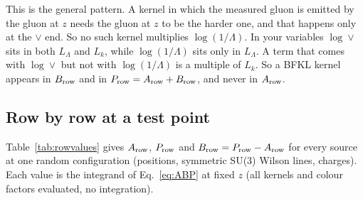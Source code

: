 \documentclass[10pt]{article}
\numberwithin{equation}{section}
\newcommand{\LL}{L_\Lambda}
\newcommand{\Lk}{L_k}
\begin{document}
This is the general pattern. A kernel in which the measured gluon is emitted by the gluon at $z$ needs the gluon at $z$ to be the harder one, and that happens only at the $\vee$ end. So no such kernel multiplies $\log(1/\Lambda)$. In your variables $\log\vee$ sits in both $\LL$ and $\Lk$, while $\log(1/\Lambda)$ sits only in $\LL$. A term that comes with $\log\vee$ but not with $\log(1/\Lambda)$ is a multiple of $\Lk$. So a BFKL kernel appears in $B_{\rm row}$ and in $P_{\rm row}=A_{\rm row}+B_{\rm row}$, and never in $A_{\rm row}$.

\subsection{Row by row at a test point}\label{sec:rowvalues}
Table~\ref{tab:rowvalues} gives $A_{\rm row}$, $P_{\rm row}$ and $B_{\rm row}=P_{\rm row}-A_{\rm row}$ for every source at one random configuration (positions, symmetric SU(3) Wilson lines, charges). Each value is the integrand of Eq.~\eqref{eq:ABP} at fixed $z$ (all kernels and colour factors evaluated, no integration).
\end{document}
